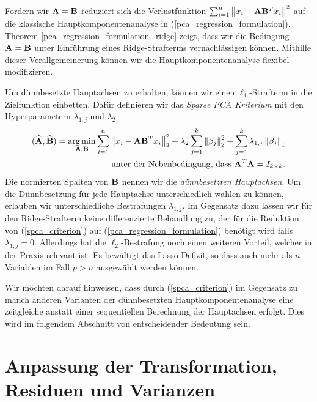 Fordern wir $\mathbf{A} =  \mathbf{B}$ reduziert sich die Verlustfunktion $\sum_{i=1}^{n} \left\lVert x_i - \mathbf{A}\mathbf{B}^Tx_i \right\rVert^2$ auf die klassische Hauptkomponentenanalyse in (\ref{pca_regression_formulation}). Theorem \ref{pca_regression_formulation_ridge} zeigt, dass wir die Bedingung $\mathbf{A} = \mathbf{B}$ unter Einführung eines Ridge-Strafterms vernachlässigen können. Mithilfe dieser Verallgemeinerung können wir die Hauptkomponentenanalyse flexibel modifizieren.

Um dünnbesetzte Hauptachsen zu erhalten, können wir einen $\ell_1$-Strafterm in die Zielfunktion einbetten. Dafür definieren wir das \textit{Sparse PCA Kriterium} mit den Hyperparametern $\lambda_{1,j}$ und $\lambda_2$
\begin{align}
\label{spca_criterion}
\begin{split}
(\widehat{\mathbf{A}}, \widehat{\mathbf{B}}) = \operatorname*{arg\,min}_{\mathbf{A}, \mathbf{B}} \sum_{i=1}^{n} \left\lVert x_i - \mathbf{A}\mathbf{B}^Tx_i \right\rVert_2^2 + \lambda_2 \sum_{j=1}^{k}\left\lVert \beta_j \right\rVert_2^2 + \sum_{j=1}^k \lambda_{1,j} \left\lVert \beta_j \right\rVert_1\\
\text{unter der Nebenbedingung, dass } \mathbf{A}^T\mathbf{A} = I_{k \times k}.
\end{split}
\end{align}
Die normierten Spalten von $\mathbf{B}$ nennen wir die \textit{dünnbesetzten Hauptachsen}. Um die Dünnbesetzung für jede Hauptachse unterschiedlich wählen zu können, erlauben wir unterschiedliche Bestrafungen $\lambda_{1,j}$. Im Gegensatz dazu lassen wir für den Ridge-Strafterm keine differenzierte Behandlung zu, der für die Reduktion von (\ref{spca_criterion}) auf (\ref{pca_regression_formulation}) benötigt wird falls $\lambda_{1,j} = 0$. Allerdings hat die $\ell_2$-Bestrafung noch einen weiteren Vorteil, welcher in der Praxis relevant ist. Es bewältigt das Lasso-Defizit, so dass auch mehr als $n$ Variablen im Fall $p>n$ ausgewählt werden können.

Wir möchten darauf hinweisen, dass durch (\ref{spca_criterion}) im Gegensatz zu manch anderen Varianten der dünnbesetzten Hauptkomponentenanalyse eine zeitgleiche anstatt einer sequentiellen Berechnung der Hauptachsen erfolgt. Dies wird im folgendem Abschnitt von entscheidender Bedeutung sein.




\section{Anpassung der Transformation, Residuen und Varianzen}
\label{adjustment_of_variances}

